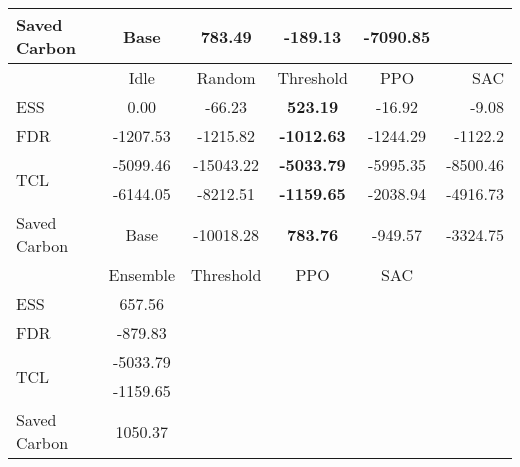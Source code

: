 \documentclass{article}
\begin{document}
\begin{table*}[t]
\begin{center}
\begin{small}
\begin{sc}
\begin{tabular}{lccccr}
    Saved Carbon         & Base     & \textbf{783.49}    & -189.13  & -7090.85\\
    \midrule
                         & Idle     & Random& Threshold & PPO      & SAC\\
    \midrule
    ESS                  & 0.00     &-66.23& \textbf{523.19}    & -16.92   & -9.08\\
    FDR                  & -1207.53 &-1215.82& \textbf{-1012.63}  & -1244.29 & -1122.2\\
    \multirow{2}{*}{TCL} & -5099.46 &-15043.22& \textbf{-5033.79}  & -5995.35 & -8500.46\\
                         & -6144.05 &-8212.51& \textbf{-1159.65}  & -2038.94 & -4916.73\\
    Saved Carbon         & Base     &-10018.28& \textbf{783.76}    & -949.57  & -3324.75\\
    \midrule
                         & Ensemble & Threshold & PPO      & SAC\\
    \midrule
    ESS                  & 657.56   &&&\\     
    FDR                  & -879.83  &&&\\ 
    \multirow{2}{*}{TCL} & -5033.79 &&&\\ 
                         & -1159.65 &&&\\ 
    Saved Carbon         & 1050.37  &&&\\ 
    \bottomrule
    \end{tabular}
    \end{sc}
    \end{small}
    \end{center}
    \vskip -0.1in
    \end{table*}
\end{document}
